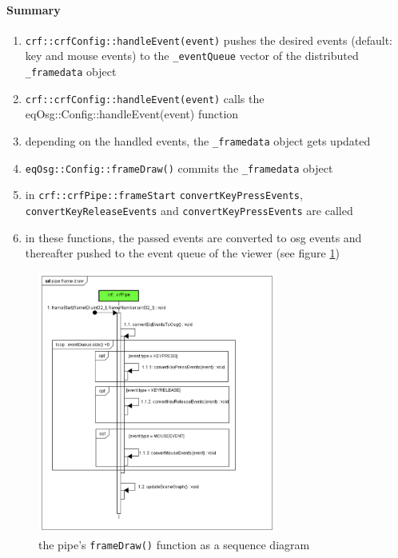 \paragraph{Summary}
\begin{enumerate}
	\item \texttt{crf::crfConfig::handleEvent(event)} pushes the desired events (default: key and mouse events) to the \texttt{\_eventQueue} vector of the distributed \texttt{\_framedata} object
	\item \texttt{crf::crfConfig::handleEvent(event)} calls the eqOsg::Config::handleEvent(event) function
	\item depending on the handled events, the \texttt{\_framedata} object gets updated
	\item \texttt{eqOsg::Config::frameDraw()} commits the \texttt{\_framedata} object
	\item in \texttt{crf::crfPipe::frameStart} \texttt{convertKeyPressEvents}, \texttt{convertKeyReleaseEvents} and \texttt{convertKeyPressEvents} are called
	\item in these functions, the passed events are converted to \gls{osg} events and thereafter pushed to the event queue of the viewer (see figure \ref{fig:crf_seq_pipe_frame_draw_01})
\end{enumerate}

\begin{figure}[H]
	\centering
		\includegraphics[width=0.70\textwidth]{../figures/crf_seq_pipe_frame_draw_01}
	\caption{the pipe's \texttt{frameDraw()} function as a sequence diagram }
	\label{fig:crf_seq_pipe_frame_draw_01}
\end{figure}

